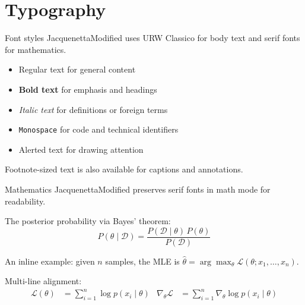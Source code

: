 \documentclass[aspectratio=169]{beamer}
\begin{document}
\section{Typography}


\begin{frame}{Font styles}
    JacquenettaModified uses URW Classico for body text and
    serif fonts for mathematics.

    \vspace{0.4cm}
    \begin{itemize}
        \item Regular text for general content
        \item \textbf{Bold text} for emphasis and headings
        \item \textit{Italic text} for definitions or foreign terms
        \item \texttt{Monospace} for code and technical identifiers
        \item \alert{Alerted text} for drawing attention
    \end{itemize}

    \vspace{0.4cm}
    {\footnotesize Footnote-sized text is also available for captions
    and annotations.}
\end{frame}

\begin{frame}{Mathematics}
    JacquenettaModified preserves serif fonts in math mode for readability.

    \vspace{0.2cm}
    The posterior probability via Bayes' theorem:
    \[
        P(\theta \mid \mathcal{D}) =
        \frac{P(\mathcal{D} \mid \theta)\, P(\theta)}
             {P(\mathcal{D})}
    \]

    An inline example: given $n$ samples, the MLE is
    $\hat{\theta} = \arg\max_\theta \mathcal{L}(\theta; x_1, \dots, x_n)$.

    \vspace{0.2cm}
    Multi-line alignment:
    \begin{align}
        \mathcal{L}(\theta)
            &= \textstyle\sum_{i=1}^{n} \log p(x_i \mid \theta)
        &
        \nabla_\theta \mathcal{L}
            &= \textstyle\sum_{i=1}^{n}
                \nabla_\theta \log p(x_i \mid \theta)
    \end{align}
\end{frame}
\end{document}
